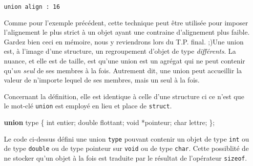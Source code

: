 \documentclass[]{article}
\newenvironment{Shaded}{}{}
\newcommand{\KeywordTok}[1]{\textcolor[rgb]{0.00,0.44,0.13}{\textbf{{#1}}}}
\newcommand{\DataTypeTok}[1]{\textcolor[rgb]{0.56,0.13,0.00}{{#1}}}
\newcommand{\DecValTok}[1]{\textcolor[rgb]{0.25,0.63,0.44}{{#1}}}
\newcommand{\SpecialCharTok}[1]{\textcolor[rgb]{0.25,0.44,0.63}{{#1}}}
\newcommand{\StringTok}[1]{\textcolor[rgb]{0.25,0.44,0.63}{{#1}}}
\newcommand{\ImportTok}[1]{{#1}}
\newcommand{\ControlFlowTok}[1]{\textcolor[rgb]{0.00,0.44,0.13}{\textbf{{#1}}}}
\newcommand{\PreprocessorTok}[1]{\textcolor[rgb]{0.74,0.48,0.00}{{#1}}}
\newcommand{\NormalTok}[1]{{#1}}
\begin{document}
\begin{Shaded}
\end{Shaded}

\begin{verbatim}
union align : 16
\end{verbatim}

Comme pour l'exemple précédent, cette technique peut être utilisée pour
imposer l'alignement le plus strict à un objet ayant une contraine
d'alignement plus faible. Gardez bien ceci en mémoire, nous y
reviendrons lors du T.P. final. ;)Une union est, à l'image d'une
structure, un regroupement d'objet de type \emph{différents}. La nuance,
et elle est de taille, est qu'une union est un agrégat qui ne peut
contenir qu'\emph{un seul} de ses membres à la fois. Autrement dit, une
union peut accueillir la valeur de n'importe lequel de ses membres, mais
un seul à la fois.

Concernant la définition, elle est identique à celle d'une structure ci
ce n'est que le mot-clé \texttt{union} est employé en lieu et place de
\texttt{struct}.

\begin{Shaded}
\begin{Highlighting}[]
\KeywordTok{union} \NormalTok{type}
\NormalTok{\{}
    \DataTypeTok{int} \NormalTok{entier;}
    \DataTypeTok{double} \NormalTok{flottant;}
    \DataTypeTok{void} \NormalTok{*pointeur;}
    \DataTypeTok{char} \NormalTok{lettre;}
\NormalTok{\};}
\end{Highlighting}
\end{Shaded}

Le code ci-dessus défini une union \texttt{type} pouvant contenir un
objet de type \texttt{int} ou de type \texttt{double} ou de type
pointeur sur \texttt{void} ou de type \texttt{char}. Cette possiblité de
ne stocker qu'un objet à la fois est traduite par le résultat de
l'opérateur \texttt{sizeof}.
\end{document}
